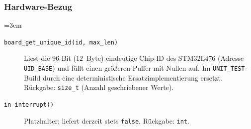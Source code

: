 \subsubsection*{Hardware-Bezug}
{\sloppy\emergencystretch=3em
\begin{description}
\item[\texttt{board\_get\_unique\_id(id, max\_len)}] Liest die 96-Bit
  ($12$~Byte) eindeutige Chip-ID des STM32L476 (Adresse \verb|UID_BASE|) und
  füllt einen größeren Puffer mit Nullen auf. Im \verb|UNIT_TEST|-Build durch
  eine deterministische Ersatzimplementierung ersetzt. Rückgabe: \verb|size_t|
  (Anzahl geschriebener Werte).
\item[\texttt{in\_interrupt()}] Platzhalter; liefert derzeit stets
  \verb|false|. Rückgabe: \verb|int|.
\end{description}
\par}

